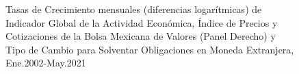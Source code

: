 \documentclass[
  a4paper,
]{article}
\begin{document}
\begin{figure}

\caption{\label{fig-fig5}Tasas de Crecimiento mensuales (diferencias
logarítmicas) de Indicador Global de la Actividad Económica, Índice de
Precios y Cotizaciones de la Bolsa Mexicana de Valores (Panel Derecho) y
Tipo de Cambio para Solventar Obligaciones en Moneda Extranjera,
Ene.2002-May.2021}

\begin{minipage}{\linewidth}



\end{minipage}%
\newline
\begin{minipage}{\linewidth}


\end{minipage}
\end{figure}
\end{document}
